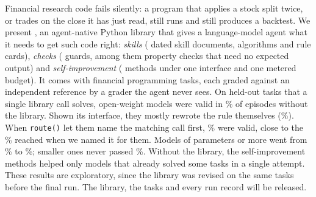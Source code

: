 Financial research code fails silently: a program that applies a stock split twice, or trades
on the close it has just read, still runs and still produces a backtest. We present \lib{}, an
agent-native Python library that gives a language-model agent what it needs to get such code
right: \emph{skills} (\NSkills{} dated skill documents, \NAlgorithms{} algorithms and
\NCards{} rule cards), \emph{checks} (\NGuards{} guards, among them \FixVisibleChecks{} property
checks that need no expected output) and \emph{self-improvement} (\NMethods{} methods under one
interface and one metered budget). It comes with \NTasks{} financial programming tasks, each
graded against an independent reference by a grader the agent never sees. On held-out tasks
that a single library call solves, \FixModels{} open-weight models were valid in
\FixFZeroPct\% of episodes without the library. Shown its interface, they mostly rewrote the
rule themselves (\FixFOnePct\%). When \texttt{route()} let them name the matching call first,
\FixFFourPct\% were valid, close to the \FixFTwoPct\% reached when we named it for them. Models
of \FixSizeCut{} parameters or more went from \FixLargeFZeroPct\% to \FixLargeFFourPct\%;
smaller ones never passed \FixSmallMaxPct\%. Without the library, the self-improvement
methods helped only models that already solved some tasks in a single attempt. These results are
exploratory,
since the library was revised on the same tasks before the final run. The library, the tasks
and every run record will be released.
